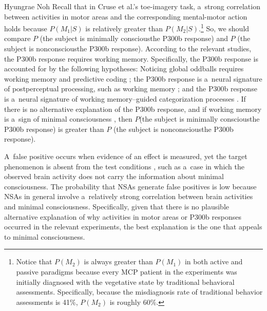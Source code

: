 \begin{artengenv}{Hyungrae Noh}
Recall that in Cruse et al.'s
\parencite*[][]{cruse_bedside_2011} %
 toe-imagery task, a~strong correlation between activities in motor areas and the corresponding mental-motor action holds because $P(M_1 | S)$ is relatively greater than $P(M_2 | S)$.\footnote{Notice that $P(M_2)$ is always greater than $P(M_1)$ in both active and passive paradigms because every MCP patient in the experiments was initially diagnosed with the vegetative state by traditional behavioral assessments. Specifically, because the misdiagnosis rate of traditional behavior assessments is 41\%, $P(M_2)$ is roughly 60\%.} So, we should compare $P$ (the subject is minimally conscious{\textbar}the P300b response) and $P$ (the subject is nonconscious{\textbar}the P300b response). According to the relevant studies, the P300b response requires working memory. Specifically, the P300b response is accounted for by the following hypotheses: Noticing global oddballs requires working memory and predictive coding 
\parencites[][]{garrido_functional_2008}[][]{garrido_repetition_2009}; %
 the P300b response is a~neural signature of postperceptual processing, such as working memory 
\parencite[][]{cohen_distinguishing_2020}; %
 and the P300b response is a~neural signature of working memory–guided categorization processes 
\parencite[][]{rac-lubashevsky_revisiting_2019}. %
 If there is no alternative explanation of the P300b response, and if working memory is a~sign of minimal consciousness 
\parencites[][]{ansell_slow--recover_1993}[][]{bekinschtein_neural_2009}[][]{king_single-trial_2013}, %
 then $P$(the subject is minimally conscious{\textbar}the P300b response) is greater than $P$ (the subject is nonconscious{\textbar}the P300b response).

A~false positive occurs when evidence of an effect is measured, yet the target phenomenon is absent from the test conditions
\parencite[][p.591]{peterson_risk_2015}, %
 such as a~case in which the observed brain activity does not carry the information about minimal consciousness. The probability that NSAs generate false positives is low because NSAs in general involve a~relatively strong correlation between brain activities and minimal consciousness. Specifically, given that there is no plausible alternative explanation of why activities in motor areas or P300b responses occurred in the relevant experiments, the best explanation is the one that appeals to minimal consciousness.


\end{artengenv}
